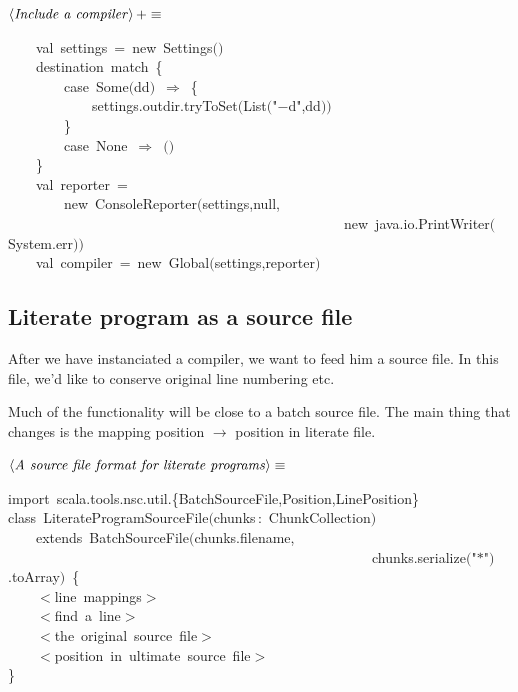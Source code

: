\documentclass[a4paper,12pt]{article}
\begin{document}
$\left<\mbox{\emph{Include a compiler}}\right>+\equiv$
\begin{program}~~~~{\vem val}~settings~=~{\vem new}~Settings$($$)$
\\~~~~destination~{\vem match}~{\small\{}
\\~~~~~~~~{\vem case}~Some$($dd$)$~$\Rightarrow$~{\small\{}
\\~~~~~~~~~~~~settings.outdir.tryToSet$($List$($"$-$d",dd$)$$)$
\\~~~~~~~~{\small\}}
\\~~~~~~~~{\vem case}~None~$\Rightarrow$~$($$)$
\\~~~~{\small\}}
\\~~~~{\vem val}~reporter~=
\\~~~~~~~~{\vem new}~ConsoleReporter$($settings,{\vem null},
\\~~~~~~~~~~~~~~~~~~~~~~~~~~~~~~~~~~~~~~~~~~~~~~~~{\vem new}~java.io.PrintWriter$($System.err$)$$)$
\\~~~~{\vem val}~compiler~=~{\vem new}~Global$($settings,reporter$)$
\\[0.5em]\end{program}
\subsection{Literate program as a source file}
After we have instanciated a compiler, we want to feed him a source
file. In this file, we'd like to conserve original line numbering etc.

Much of the functionality will be close to a batch source file. The main
thing that changes is the mapping position $\rightarrow$ position in literate
file.

$\left<\mbox{\emph{A source file format for literate programs}}\right>\equiv$
\begin{program}{\vem import}~scala.tools.nsc.util.{\small\{}BatchSourceFile,Position,LinePosition{\small\}}
\\{\vem class}~LiterateProgramSourceFile$($chunks\,{\rm :}~ChunkCollection$)$
\\~~~~{\vem extends}~BatchSourceFile$($chunks.filename,
\\~~~~~~~~~~~~~~~~~~~~~~~~~~~~~~~~~~~~~~~~~~~~~~~~~~~~chunks.serialize$($"$*$"$)$.toArray$)$~{\small\{}
\\~~~~$<$line~mappings$>$
\\~~~~$<$find~a~line$>$
\\~~~~$<$the~original~source~file$>$
\\~~~~$<$position~in~ultimate~source~file$>$
\\{\small\}}
\\[0.5em]\end{program}
\end{document}
